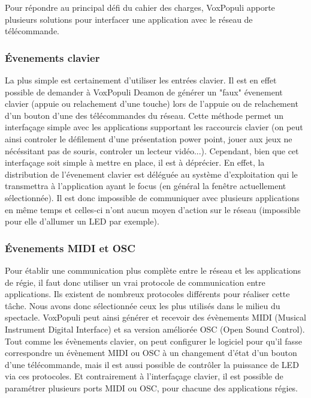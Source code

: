 \documentclass{Rapport}
\begin{document}
Pour répondre au principal défi du cahier des charges, VoxPopuli apporte plusieurs solutions pour interfacer une application avec le réseau de télécommande.

\subsubsection*{Évenements clavier}

La plus simple est certainement d'utiliser les entrées clavier. Il est en effet possible de demander à VoxPopuli Deamon de générer un "faux" évenement clavier (appuie ou relachement d'une touche) lors de l'appuie ou de relachement d'un bouton d'une des télécommandes du réseau. Cette méthode permet un interfaçage simple avec les applications supportant les raccourcis clavier (on peut ainsi controler le défilement d'une présentation power point, jouer aux jeux ne nécéssitant pas de souris, controler un lecteur vidéo...). Cependant, bien que cet interfaçage soit simple à mettre en place, il est à déprécier. En effet, la distribution de l'évenement clavier est déléguée au système d'exploitation qui le transmettra à l'application ayant le focus (en général la fenêtre actuellement sélectionnée). Il est donc impossible de communiquer avec plusieurs applications en même temps et celles-ci n'ont aucun moyen d'action sur le réseau (impossible pour elle d'allumer un LED par exemple).

\subsubsection*{Évenements MIDI et OSC}

Pour établir une communication plus complète entre le réseau et les applications de régie, il faut donc utiliser un vrai protocole de communication entre applications. Ils existent de nombreux protocoles différents pour réaliser cette tâche. Nous avons donc sélectionnée ceux les plus utilisés dans le milieu du spectacle. VoxPopuli peut ainsi générer et recevoir des évènements MIDI (Musical Instrument Digital Interface) et sa version améliorée OSC (Open Sound Control). Tout comme les évènements clavier, on peut configurer le logiciel pour qu'il fasse correspondre un évènement MIDI ou OSC à un changement d'état d'un bouton d'une télécommande, mais il est aussi possible de contrôler la puissance de LED via ces protocoles. Et contrairement à l'interfaçage clavier, il est possible de paramétrer plusieurs ports MIDI ou OSC, pour chacune des applications régies.
\end{document}
